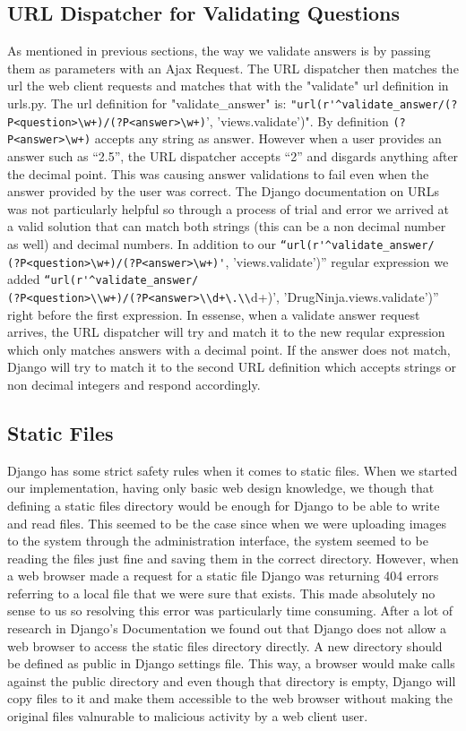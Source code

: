\documentclass{l3proj}
\begin{document}
{\subsection{URL Dispatcher for Validating Questions}
As mentioned in previous sections, the way we validate answers is by passing them as parameters with an Ajax Request.  The URL dispatcher then matches the url the web client requests and matches that with the "validate" url definition in urls.py. The url definition for "validate\_answer" is: \verb|"url(r'^validate_answer/(?P<question>\w+)/(?P<answer>\w+)|', 'views.validate')". By definition \verb|(?P<answer>\w+)| accepts any string as answer. However when a user provides an answer such as “2.5”, the URL dispatcher accepts “2” and disgards anything after the decimal point. This was causing answer validations to fail even when the answer provided by the user was correct. The Django documentation on URLs was not particularly helpful so through a process of trial and error we arrived at a valid solution that can match both strings (this can be a non decimal number as well) and decimal numbers. In addition to our \verb|“url(r'^validate_answer/|\\\verb|(?P<question>\w+)/(?P<answer>\w+)'|, 'views.validate')” regular expression we added \verb|“url(r'^validate_answer/|\\\verb|(?P<question>\\w+)/(?P<answer>\\d+\.\\|d+)', 'DrugNinja.views.validate')” right before the first expression. In essense, when a validate answer request arrives, the URL dispatcher will try and match it to the new reqular expression which only matches answers with a decimal point. If the answer does not match, Django will try to match it to the second URL definition which accepts strings or non decimal integers and respond accordingly.

\subsection{Static Files}
Django has some strict safety rules when it comes to static files. When we started our implementation, having only basic web design knowledge, we though that defining a static files directory would be enough for Django to be able to write and read files. This seemed to be the case since when we were uploading images to the system through the administration interface, the system seemed to be reading the files just fine and saving them in the correct directory. However, when a web browser made a request for a static file Django was returning 404 errors referring to a local file that we were sure that exists. This made absolutely no sense to us so resolving this error was particularly time consuming. After a lot of research in Django's Documentation we found out that Django does not allow a web browser to access the static files directory directly. A new directory should be defined as public in Django settings file. This way, a browser would make calls against the public directory and even though that directory is empty, Django will copy files to it and make them accessible to the web browser without making the original files valnurable to malicious activity by a web client user.
}
\end{document}
